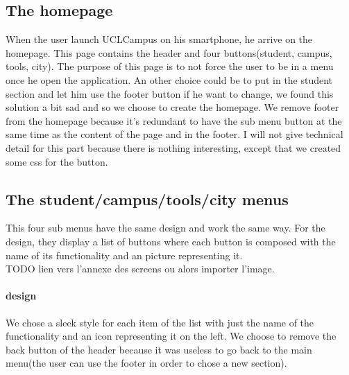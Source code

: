 \documentclass[11pt, a4paper]{report}
\begin{document}
\subsection{The homepage}
When the user launch UCLCampus on his smartphone, he arrive on the homepage. This page contains the header and four buttons(student, campus, tools, city). The purpose of this page is to not force the user to be in a menu once he open the application. An other choice could be to put in the student section and let him use the footer button if he want to change, we found this solution a bit sad and so we choose to create the homepage. We remove footer from the homepage because it's redundant to have the sub menu button at the same time as the content of the page and in the footer. I will not give technical detail for this part because there is nothing interesting, except that we created some css for the button.  
\subsection{The student/campus/tools/city menus}
This four sub menus have the same design and work the same way. For the design, they display a list of buttons where each button is composed with the name of its functionality and an picture representing it. \\TODO lien vers l'annexe des screens ou alors importer l'image. 
\paragraph{design}
We chose a sleek style for each item of the list with just the name of the functionality and an icon representing it on the left. We choose to remove the back button of the header because it was useless to go back to the main menu(the user can use the footer in order to chose a new section).
\end{document}
